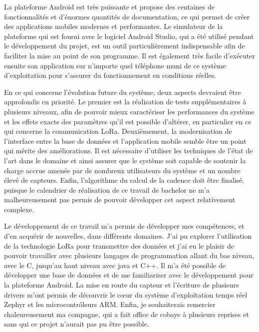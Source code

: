 La plateforme Android est très puissante et propose des centaines de fonctionnalités et d'énormes quantités de documentation, ce qui permet de créer des applications mobiles modernes et performantes. Le simulateur de la plateforme qui est fourni avec le logiciel Android Studio, qui a été utilisé pendant le développement du projet, est un outil particulièrement indispensable afin de faciliter la mise au point de son programme. Il est également très facile d'exécuter ensuite son application sur n'importe quel téléphone muni de ce système d'exploitation pour s'assurer du fonctionnement en conditions réelles.

En ce qui concerne l'évolution future du système, deux aspects devraient être approfondis en priorité. Le premier est la réalisation de tests supplémentaires à plusieurs niveaux, afin de pouvoir mieux caractériser les performances du système et les effets exacts des paramètres qu'il est possible d'altérer, en particulier en ce qui concerne la communication LoRa. Deuxièmement, la modernisation de l'interface entre la base de données et l'application mobile semble être un point qui mérite des améliorations. Il est nécessaire d'utiliser les techniques de l'état de l'art dans le domaine et ainsi assurer que le système soit capable de soutenir la charge accrue amenée par de nombreux utilisateurs du système et un nombre élevé de capteurs. Enfin, l'algorithme du calcul de la cadence doit être finalisé, puisque le calendrier de réalisation de ce travail de bachelor ne m'a malheureusement pas permis de pouvoir développer cet aspect relativement complexe.

Le développement de ce travail m'a permis de développer mes compétences, et d’en acquérir de nouvelles, dans différents domaines. J'ai pu explorer l'utilisation de la technologie LoRa pour transmettre des données et j'ai eu le plaisir de pouvoir travailler avec plusieurs langages de programmation allant du bas niveau, avec le C, jusqu'au haut niveau avec java et C++. Il m'a été possible de développer une base de données et de me familiariser avec le développement pour la plateforme Android. La mise en route du capteur et l'écriture de plusieurs drivers m'ont permis de découvrir le cœur du système d'exploitation temps réel Zephyr et les microcontrôleurs ARM. Enfin, je souhaiterais remercier chaleureusement ma compagne, qui a fait office de cobaye à plusieurs reprises et sans qui ce projet n'aurait pas pu être possible.


